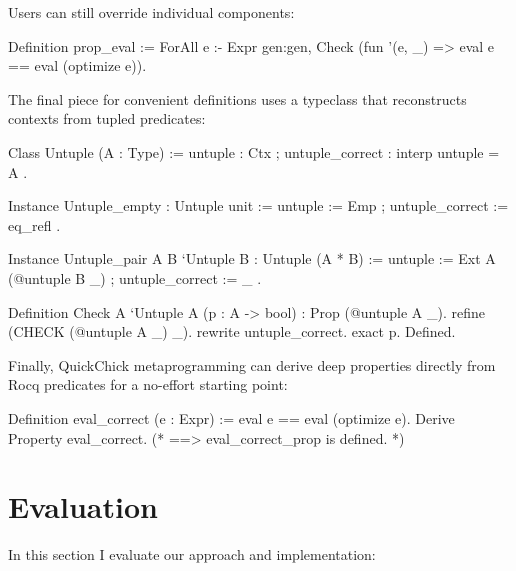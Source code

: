 Users can still override individual components:

\begin{code}[language=Rocq]
Definition prop_eval :=
  ForAll e :- Expr gen:gen,
  Check (fun '(e, _) => eval e == eval (optimize e)).
\end{code}

The final piece for convenient  definitions uses a typeclass
that reconstructs contexts from tupled predicates:

\begin{code}[language=Rocq]
Class Untuple (A : Type) :=
  { untuple : Ctx
  ; untuple_correct : interp untuple = A }.
\end{code}

\begin{code}[language=Rocq]
Instance Untuple_empty : Untuple unit :=
  { untuple := Emp
  ; untuple_correct := eq_refl }.

Instance Untuple_pair {A B} `{Untuple B} : Untuple (A * B) :=
  { untuple := Ext A (@untuple B _)
  ; untuple_correct := _ }.
\end{code}

\begin{code}[language=Rocq]
Definition Check {A} `{Untuple A} (p : A -> bool) : Prop (@untuple A _).
  refine (CHECK (@untuple A _) _).
  rewrite untuple_correct.
  exact p.
Defined.
\end{code}

Finally, QuickChick metaprogramming can derive deep properties directly from Rocq
predicates for a no-effort starting point:

\begin{code}[language=Rocq]
Definition eval_correct (e : Expr) := eval e == eval (optimize e).
Derive Property eval_correct.
(* ==> eval_correct_prop is defined. *)
\end{code}

\section{Evaluation}
\label{sec:eval}

In this section I evaluate our approach and implementation:

